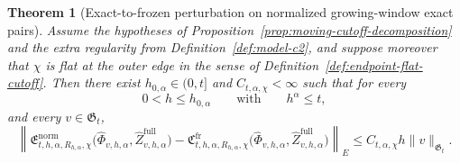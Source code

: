 \documentclass[11pt,a4paper]{amsart}
\theoremstyle{plain}
\newtheorem{theorem}{Theorem}[section]
\theoremstyle{definition}
\theoremstyle{remark}
\begin{document}
\begin{theorem}[Exact-to-frozen perturbation on normalized growing-window exact pairs]
\label{thm:full-h-coupled-alpha-exact-to-frozen}
Assume the hypotheses of Proposition~\ref{prop:moving-cutoff-decomposition} and the extra
regularity from Definition~\ref{def:model-c2}, and suppose moreover
that \(\chi\) is flat at the outer edge in the sense of Definition~\ref{def:endpoint-flat-cutoff}.
Then there exist \(h_{0,\alpha}\in(0,t]\) and \(C_{t,\alpha,\chi}<\infty\) such that for every
\[
0<h\le h_{0,\alpha}
\qquad\text{with}\qquad
h^\alpha\le t,
\]
and every \(v\in\mathfrak G_t\),
\begin{equation}\label{eq:full-h-coupled-alpha-exact-to-frozen}
\left\|
\mathfrak E_{t,h,\alpha,R_{h,\alpha},\chi}^{\mathrm{norm}}
\bigl(
\widehat\Phi_{v,h,\alpha},
\widehat Z_{v,h,\alpha}^{\mathrm{full}}
\bigr)
-
\mathfrak C_{t,h,\alpha,R_{h,\alpha},\chi}^{\mathrm{fr}}
\bigl(
\widehat\Phi_{v,h,\alpha},
\widehat Z_{v,h,\alpha}^{\mathrm{full}}
\bigr)
\right\|_{E}
\le
C_{t,\alpha,\chi}h\|v\|_{\mathfrak G_t}.
\end{equation}
\end{theorem}
\end{document}
